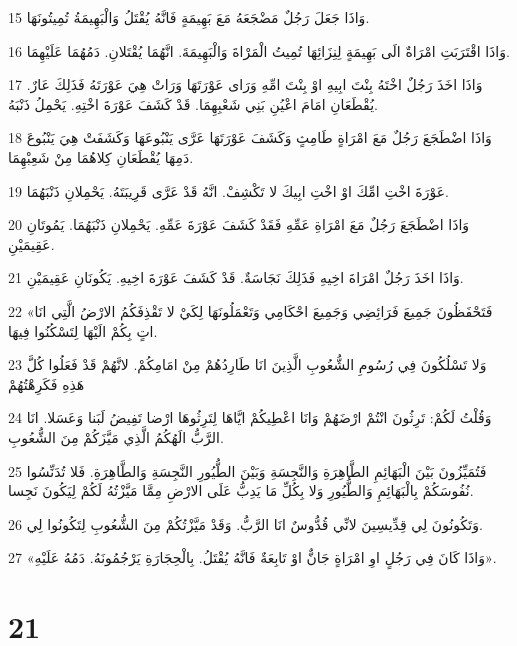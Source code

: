 \par 15 وَاذَا جَعَلَ رَجُلٌ مَضْجَعَهُ مَعَ بَهِيمَةٍ فَانَّهُ يُقْتَلُ وَالْبَهِيمَةُ تُمِيتُونَهَا.
\par 16 وَاذَا اقْتَرَبَتِ امْرَاةٌ الَى بَهِيمَةٍ لِنِزَائِهَا تُمِيتُ الْمَرْاةَ وَالْبَهِيمَةَ. انَّهُمَا يُقْتَلانِ. دَمُهُمَا عَلَيْهِمَا.
\par 17 وَاذَا اخَذَ رَجُلٌ اخْتَهُ بِنْتَ ابِيهِ اوْ بِنْتَ امِّهِ وَرَاى عَوْرَتَهَا وَرَاتْ هِيَ عَوْرَتَهُ فَذَلِكَ عَارٌ. يُقْطَعَانِ امَامَ اعْيُنِ بَنِي شَعْبِهِمَا. قَدْ كَشَفَ عَوْرَةَ اخْتِهِ. يَحْمِلُ ذَنْبَهُ.
\par 18 وَاذَا اضْطَجَعَ رَجُلٌ مَعَ امْرَاةٍ طَامِثٍ وَكَشَفَ عَوْرَتَهَا عَرَّى يَنْبُوعَهَا وَكَشَفَتْ هِيَ يَنْبُوعَ دَمِهَا يُقْطَعَانِ كِلاهُمَا مِنْ شَعِبْهِمَا.
\par 19 عَوْرَةَ اخْتِ امِّكَ اوْ اخْتِ ابِيكَ لا تَكْشِفْ. انَّهُ قَدْ عَرَّى قَرِيبَتَهُ. يَحْمِلانِ ذَنْبَهُمَا.
\par 20 وَاذَا اضْطَجَعَ رَجُلٌ مَعَ امْرَاةِ عَمِّهِ فَقَدْ كَشَفَ عَوْرَةَ عَمِّهِ. يَحْمِلانِ ذَنْبَهُمَا. يَمُوتَانِ عَقِيمَيْنِ.
\par 21 وَاذَا اخَذَ رَجُلٌ امْرَاةَ اخِيهِ فَذَلِكَ نَجَاسَةٌ. قَدْ كَشَفَ عَوْرَةَ اخِيهِ. يَكُونَانِ عَقِيمَيْنِ.
\par 22 «فَتَحْفَظُونَ جَمِيعَ فَرَائِضِي وَجَمِيعَ احْكَامِي وَتَعْمَلُونَهَا لِكَيْ لا تَقْذِفَكُمُ الارْضُ الَّتِي انَا اتٍ بِكُمْ الَيْهَا لِتَسْكُنُوا فِيهَا.
\par 23 وَلا تَسْلُكُونَ فِي رُسُومِ الشُّعُوبِ الَّذِينَ انَا طَارِدُهُمْ مِنْ امَامِكُمْ. لانَّهُمْ قَدْ فَعَلُوا كُلَّ هَذِهِ فَكَرِهْتُهُمْ
\par 24 وَقُلْتُ لَكُمْ: تَرِثُونَ انْتُمْ ارْضَهُمْ وَانَا اعْطِيكُمْ ايَّاهَا لِتَرِثُوهَا ارْضا تَفِيضُ لَبَنا وَعَسَلا. انَا الرَّبُّ الَهُكُمُ الَّذِي مَيَّزَكُمْ مِنَ الشُّعُوبِ.
\par 25 فَتُمَيِّزُونَ بَيْنَ الْبَهَائِمِ الطَّاهِرَةِ وَالنَّجِسَةِ وَبَيْنَ الطُّيُورِ النَّجِسَةِ وَالطَّاهِرَةِ. فَلا تُدَنِّسُوا نُفُوسَكُمْ بِالْبَهَائِمِ وَالطُّيُورِ وَلا بِكُلِّ مَا يَدِبُّ عَلَى الارْضِ مِمَّا مَيَّزْتُهُ لَكُمْ لِيَكُونَ نَجِسا.
\par 26 وَتَكُونُونَ لِي قِدِّيسِينَ لانِّي قُدُّوسٌ انَا الرَّبُّ. وَقَدْ مَيَّزْتُكُمْ مِنَ الشُّعُوبِ لِتَكُونُوا لِي.
\par 27 «وَاذَا كَانَ فِي رَجُلٍ اوِ امْرَاةٍ جَانٌّ اوْ تَابِعَةٌ فَانَّهُ يُقْتَلُ. بِالْحِجَارَةِ يَرْجُمُونَهُ. دَمُهُ عَلَيْهِ».

\chapter{21}

